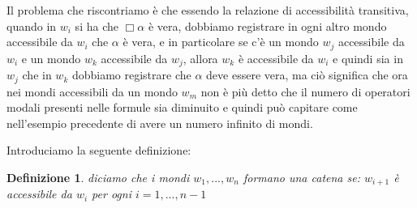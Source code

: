 \documentclass[a4paper, titlepage, 12pt]{report}
\newtheorem{definition}{Definizione}[chapter]
\begin{document}

Il problema che riscontriamo è che essendo la relazione di accessibilità transitiva,
quando in $w_i$ si ha che $\Box \alpha$ è vera, dobbiamo registrare in ogni altro mondo
accessibile da $w_i$ che $\alpha$ è vera, e in particolare se c'è un mondo $w_j$
accessibile da $w_i$ e un mondo $w_k$ accessibile da $w_j$, allora $w_k$ è accessibile
da $w_i$ e quindi sia in $w_j$ che in $w_k$ dobbiamo registrare che $\alpha$ deve essere vera,
ma ciò significa che ora nei mondi accessibili da un mondo $w_m$ non è più detto
che il numero di operatori modali presenti nelle formule sia diminuito e quindi
può capitare come nell'esempio precedente di avere un numero infinito di mondi.

Introduciamo la seguente definizione:
\begin{definition}
diciamo che i mondi $w_1, ..., w_n$ formano una catena se:
$w_{i+1}$ è accessibile da $w_i$ per ogni $i = 1, ..., n-1$
\end{definition}
\end{document}
